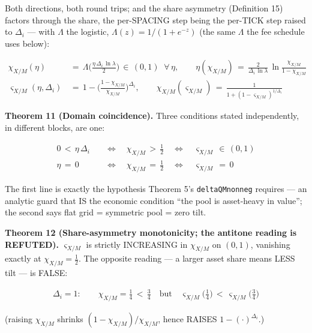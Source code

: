 \documentclass[11pt]{article}
\renewcommand{\_}{\textunderscore\allowbreak}
\begin{document}
Both directions, both round trips; and the share asymmetry (Definition 15) factors through the share, the per-SPACING step being the per-TICK step raised to \(\Delta_i\) --- with \(\Lambda\) the logistic, \(\Lambda(z) = 1/(1+e^{-z})\) (the same \(\Lambda\) the fee schedule uses below):

\[
    \begin{aligned}
        \chi_{X/M}(\eta) \, &= \, \Lambda\Big(\frac{\eta\,\Delta_i\,\ln\lambda}{2}\Big) \, \in \, (0,1) \;\; \forall\,\eta, \qquad
        \eta(\chi_{X/M}) \, = \, \frac{2}{\Delta_i\,\ln\lambda}\,\ln\frac{\chi_{X/M}}{1-\chi_{X/M}} \\[4pt]
        \varsigma_{X/M}(\eta,\Delta_i) \, &= \, 1 - \Big(\frac{1-\chi_{X/M}}{\chi_{X/M}}\Big)^{\Delta_i}, \qquad
        \chi_{X/M}(\varsigma_{X/M}) \, = \, \frac{1}{1 + (1-\varsigma_{X/M})^{1/\Delta_i}}
    \end{aligned}
\]

\textbf{Theorem 11 (Domain coincidence).} Three conditions stated independently, in different blocks, are one:

\[
    \begin{aligned}
        0 \, < \, \eta\,\Delta_i \quad &\Longleftrightarrow \quad \chi_{X/M} \, > \, \tfrac{1}{2} \quad \Longleftrightarrow \quad \varsigma_{X/M} \, \in \, (0,1) \\
        \eta \, = \, 0 \quad &\Longleftrightarrow \quad \chi_{X/M} \, = \, \tfrac{1}{2} \quad \Longleftrightarrow \quad \varsigma_{X/M} \, = \, 0
    \end{aligned}
\]

The first line is exactly the hypothesis Theorem 5's \texttt{deltaQM\_nonneg} requires --- an analytic guard that IS the economic condition ``the pool is asset-heavy in value''; the second says flat grid = symmetric pool = zero tilt.

\textbf{Theorem 12 (Share-asymmetry monotonicity; the antitone reading is REFUTED).} \(\varsigma_{X/M}\) is strictly INCREASING in \(\chi_{X/M}\) on \((0,1)\), vanishing exactly at \(\chi_{X/M} = \tfrac12\). The opposite reading --- a larger asset share means LESS tilt --- is FALSE:

\[
    \begin{aligned}
        \Delta_i = 1: \qquad \chi_{X/M} = \tfrac14 \, < \, \tfrac34 \quad \text{but} \quad \varsigma_{X/M}\big(\tfrac14\big) \, < \, \varsigma_{X/M}\big(\tfrac34\big)
    \end{aligned}
\]

(raising \(\chi_{X/M}\) shrinks \((1-\chi_{X/M})/\chi_{X/M}\), hence RAISES \(1 - (\cdot)^{\Delta_i}\).)
\end{document}
